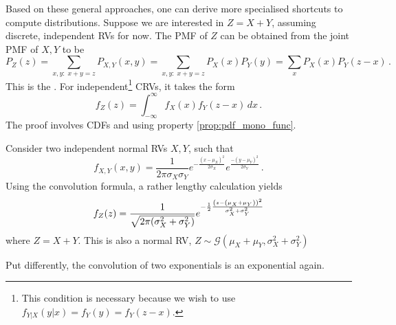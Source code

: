 Based on these general approaches, one can derive more specialised shortcuts to compute distributions. Suppose we are interested in $Z = X + Y$, assuming discrete, independent RVs for now. The PMF of $Z$ can be obtained from the joint PMF of $X, Y$ to be
\begin{equation}
P_Z(z) = \sum_{x, y: \; x + y = z} P_{X, Y}(x, y) = \sum_{x, y: \; x + y = z} P_X(x) P_Y(y) = \sum_x P_X(x) P_Y(z - x) \, .%
\end{equation}
This is the . For independent\footnote{This condition is necessary because we wish to use $f_{Y | X}(y | x) = f_Y(y) = f_Y(z - x)$.} CRVs, it takes the form
\begin{equation}
f_Z(z) = \int_{- \infty}^\infty f_X(x) f_Y(z - x) \, dx \, .
\end{equation}
The proof involves CDFs and using property \ref{prop:pdf_mono_func}.










\begin{ex}
Consider two independent normal RVs $X, Y$, such that
\begin{equation*}
f_{X, Y}(x, y) = \frac{1}{2\pi \sigma_X \sigma_Y} e^{- \frac{(x - \mu_X)^2}{2 \sigma_X}} e^{\frac{- (y - \mu_Y)^2}{2 \sigma_Y}} \, .
\end{equation*}
Using the convolution formula, a rather lengthy calculation yields
\begin{equation}
f_Z(z) = \frac{1}{\sqrt{2 \pi \qty(\sigma_X^2 + \sigma_Y^2)}} e^{- \frac{1}{2} \frac{\qty(z - \qty(\mu_X + \mu_Y))^2}{\sigma_X^2 + \sigma_Y^2}}
\end{equation}
where $Z = X + Y$. This is also a normal RV, $Z \sim \mathcal{G}(\mu_X + \mu_Y, \sigma_X^2 + \sigma_Y^2)$

Put differently, the convolution of two exponentials is an exponential again.

\end{ex}



